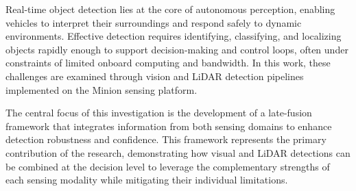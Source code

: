 \documentclass{erauthesis}
\begin{document}



Real-time object detection lies at the core of autonomous perception, enabling vehicles to interpret their surroundings and respond safely to dynamic environments.
Effective detection requires identifying, classifying, and localizing objects rapidly enough to support decision-making and control loops, often under constraints of limited onboard computing and bandwidth.
In this work, these challenges are examined through vision and LiDAR detection pipelines implemented on the Minion sensing platform.

The central focus of this investigation is the development of a late-fusion framework that integrates information from both sensing domains to enhance detection robustness and confidence.
This framework represents the primary contribution of the research, demonstrating how visual and LiDAR detections can be combined at the decision level to leverage the complementary strengths of each sensing modality while mitigating their individual limitations.
\end{document}
